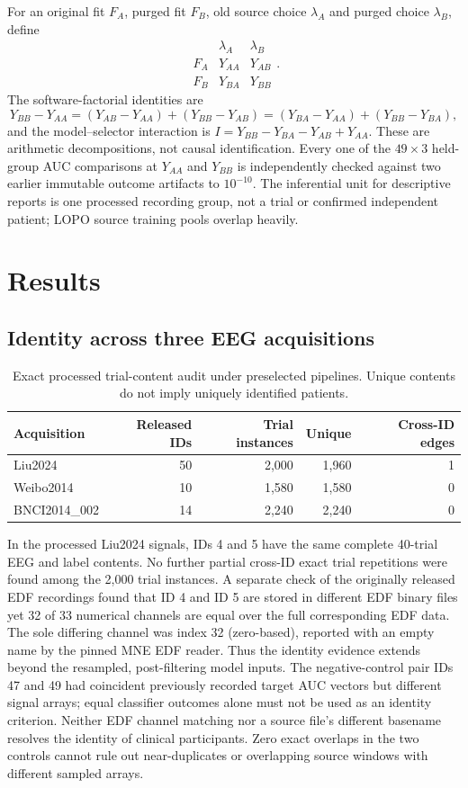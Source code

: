 \documentclass[11pt,a4paper]{article}
\begin{document}
For an original fit $F_A$, purged fit $F_B$, old source
choice $\lambda_A$ and purged choice $\lambda_B$, define
\[
\begin{array}{c|cc}
 & \lambda_A & \lambda_B\\\hline
 F_A&Y_{AA}&Y_{AB}\\
 F_B&Y_{BA}&Y_{BB}
\end{array}.
\]
The software-factorial identities are
\[
Y_{BB}-Y_{AA}=(Y_{AB}-Y_{AA})+(Y_{BB}-Y_{AB})
=(Y_{BA}-Y_{AA})+(Y_{BB}-Y_{BA}),
\]
and the model--selector interaction is
$I=Y_{BB}-Y_{BA}-Y_{AB}+Y_{AA}$.
These are arithmetic decompositions, not causal identification.
Every one of the $49\times3$ held-group AUC comparisons at
$Y_{AA}$ and $Y_{BB}$ is independently checked against
two earlier immutable outcome artifacts to $10^{-10}$.
The inferential unit for descriptive reports is one processed
recording group, not a trial or confirmed independent patient;
LOPO source training pools overlap heavily.

\section{Results}
\subsection{Identity across three EEG acquisitions}
\begin{table}[ht]\centering\small
\caption{Exact processed trial-content audit under preselected
pipelines. Unique contents do not imply uniquely identified patients.}
\begin{tabular}{lrrrr}
\toprule
Acquisition & Released IDs & Trial instances & Unique & Cross-ID edges\\\midrule
Liu2024 &50&2,000&1,960&1\\
Weibo2014 &10&1,580&1,580&0\\
BNCI2014\_002 &14&2,240&2,240&0\\
\bottomrule
\end{tabular}\end{table}
In the processed Liu2024 signals, IDs 4 and 5 have the same complete
40-trial EEG and label contents. No further partial cross-ID exact
trial repetitions were found among the 2,000 trial instances.
A separate check of the originally released EDF recordings found
that ID 4 and ID 5 are stored in different EDF binary files yet
32 of 33 numerical channels are equal over the full corresponding
EDF data. The sole differing channel was index 32 (zero-based),
reported with an empty name by the pinned MNE EDF reader.
Thus the identity evidence extends beyond the resampled,
post-filtering model inputs. The negative-control pair IDs 47
and 49 had coincident previously recorded target AUC vectors
but different signal arrays; equal classifier outcomes alone
must not be used as an identity criterion.
Neither EDF channel matching nor a source file's different
basename resolves the identity of clinical participants.
Zero exact overlaps in the two controls cannot rule out near-duplicates
or overlapping source windows with different sampled arrays.
\end{document}
